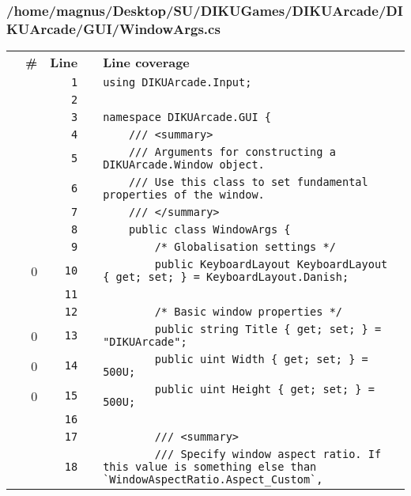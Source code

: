 \documentclass[a4paper,landscape,10pt]{article}
\begin{document}
\subsubsection{/home/magnus/Desktop/SU/DIKUGames/DIKUArcade/DIKUArcade/GUI/WindowArgs.cs}
\begin{longtable}[l]{lrrll}
\textbf{} & \textbf{\#} & \textbf{Line} & \textbf{} & \textbf{Line coverage}\\
\cellcolor{gray} &  & \verb~1~ & & \verb~using DIKUArcade.Input;~\\
\cellcolor{gray} &  & \verb~2~ & & \verb~~\\
\cellcolor{gray} &  & \verb~3~ & & \verb~namespace DIKUArcade.GUI {~\\
\cellcolor{gray} &  & \verb~4~ & & \verb~    /// <summary>~\\
\cellcolor{gray} &  & \verb~5~ & & \verb~    /// Arguments for constructing a DIKUArcade.Window object.~\\
\cellcolor{gray} &  & \verb~6~ & & \verb~    /// Use this class to set fundamental properties of the window.~\\
\cellcolor{gray} &  & \verb~7~ & & \verb~    /// </summary>~\\
\cellcolor{gray} &  & \verb~8~ & & \verb~    public class WindowArgs {~\\
\cellcolor{gray} &  & \verb~9~ & & \verb~        /* Globalisation settings */~\\
\cellcolor{red} & 0 & \verb~10~ & & \verb~        public KeyboardLayout KeyboardLayout { get; set; } = KeyboardLayout.Danish;~\\
\cellcolor{gray} &  & \verb~11~ & & \verb~~\\
\cellcolor{gray} &  & \verb~12~ & & \verb~        /* Basic window properties */~\\
\cellcolor{red} & 0 & \verb~13~ & & \verb~        public string Title { get; set; } = "DIKUArcade";~\\
\cellcolor{red} & 0 & \verb~14~ & & \verb~        public uint Width { get; set; } = 500U;~\\
\cellcolor{red} & 0 & \verb~15~ & & \verb~        public uint Height { get; set; } = 500U;~\\
\cellcolor{gray} &  & \verb~16~ & & \verb~~\\
\cellcolor{gray} &  & \verb~17~ & & \verb~        /// <summary>~\\
\cellcolor{gray} &  & \verb~18~ & & \verb~        /// Specify window aspect ratio. If this value is something else than `WindowAspectRatio.Aspect_Custom`,~\\

\end{longtable}
\end{document}
